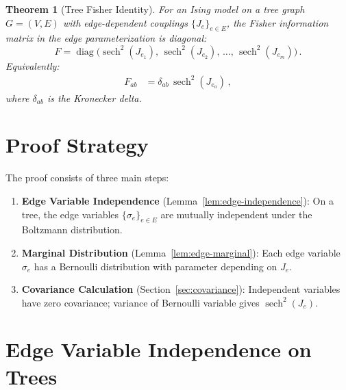 \documentclass[11pt]{article}
\newtheorem{theorem}{Theorem}
\theoremstyle{definition}
\theoremstyle{remark}
\begin{document}
\begin{theorem}[Tree Fisher Identity]
\label{thm:tree-fisher-identity}
For an Ising model on a tree graph $G = (V,E)$ with edge-dependent
couplings $\{J_e\}_{e \in E}$, the Fisher information matrix in the
edge parameterization is diagonal:
\begin{equation}
\label{eq:tree-fisher-result}
F = \operatorname{diag}\bigl(\operatorname{sech}^2(J_{e_1}),\,
\operatorname{sech}^2(J_{e_2}),\, \ldots,\,
\operatorname{sech}^2(J_{e_m})\bigr)\,.
\end{equation}
Equivalently:
\begin{align}
F_{ab} &= \delta_{ab}\, \operatorname{sech}^2(J_{e_a})\,, \label{eq:tree-fisher-components}
\end{align}
where $\delta_{ab}$ is the Kronecker delta.
\end{theorem}

\section{Proof Strategy}

The proof consists of three main steps:

\begin{enumerate}
\item \textbf{Edge Variable Independence} (Lemma~\ref{lem:edge-independence}):
On a tree, the edge variables $\{\sigma_e\}_{e \in E}$ are mutually
independent under the Boltzmann distribution.

\item \textbf{Marginal Distribution} (Lemma~\ref{lem:edge-marginal}):
Each edge variable $\sigma_e$ has a Bernoulli distribution with parameter
depending on $J_e$.

\item \textbf{Covariance Calculation} (Section~\ref{sec:covariance}):
Independent variables have zero covariance; variance of Bernoulli variable
gives $\operatorname{sech}^2(J_e)$.
\end{enumerate}

\section{Edge Variable Independence on Trees}
\end{document}

